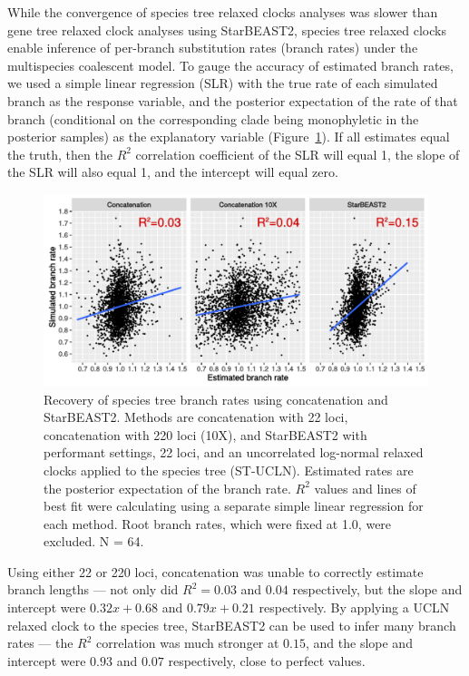 \documentclass[12pt]{article}
\begin{document}
While the convergence of species tree relaxed clocks analyses was slower than
gene tree relaxed clock analyses using StarBEAST2, species tree relaxed clocks
enable inference of per-branch substitution rates (branch rates) under the multispecies
coalescent model. To gauge the accuracy of estimated branch rates, we used
a simple linear regression (SLR) with the true rate of each simulated branch as
the response variable, and the posterior expectation of the rate of that branch
(conditional on the corresponding clade being monophyletic in the posterior
samples) as the explanatory variable (Figure~\ref{fig:branchRatesLM}). If all
estimates equal the truth, then the $R^2$ correlation coefficient of the SLR
will equal 1, the slope of the SLR will also equal 1, and the intercept will
equal zero.

\begin{figure}[htb!]
\centering
\includegraphics[width=16cm]{branch_rates.pdf}
\caption
{Recovery of species tree branch rates using concatenation and StarBEAST2.
Methods are concatenation with 22 loci, concatenation with 220 loci (10X), and
StarBEAST2 with performant settings, 22 loci, and an uncorrelated log-normal
relaxed clocks applied to the species tree (ST-UCLN). Estimated rates are the
posterior expectation of the branch rate. $R^2$ values and lines of best fit were calculating using a separate
simple linear regression for each method. Root branch rates, which were fixed at
1.0, were excluded. N = 64.}
\label{fig:branchRatesLM}
\end{figure}

Using either 22 or 220 loci, concatenation was unable to correctly estimate
branch lengths --- not only did $R^2 = 0.03$ and $0.04$ respectively, but the
slope and intercept were $0.32x + 0.68$ and $0.79x + 0.21$ respectively. By
applying a UCLN relaxed clock to the species tree, StarBEAST2 can be used to
infer many branch rates --- the $R^2$ correlation was much stronger at $0.15$,
and the slope and intercept were $0.93$ and $0.07$ respectively, close to
perfect values.
\end{document}
